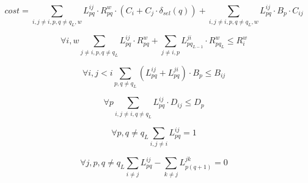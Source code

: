 $$
cost = 
    \sum_{i,j\neq i,p,q \neq q_L,w} {L^{ij}_{pq} \cdot R^{w}_{pq} \cdot(C_{i}+C_{j} \cdot \delta_{sel}(q))} + 
    \sum_{i,j \neq i,p,q \neq q_L,w} L^{ij}_{pq} \cdot B_p \cdot  C_{ij}
$$

$$
\forall i,w 
    \sum_{j \neq i,p,q \neq q_L} L^{ij}_{pq} \cdot R^{w}_{pq} +
    \sum_{j \neq i,p} L^{ji}_{pq_{L-1}} \cdot R^{w}_{pq_L}
    \leq R^{w}_i
$$

$$
    \forall i, j < i \sum_{p,q \neq q_{L}} (L^{ij}_{pq} + L^{ji}_{pq}) \cdot B_p \leq B_{ij}
$$

$$
    \forall{p} \sum_{i,j \neq i,q \neq q_L} L^{ij}_{pq} \cdot D_{ij} \leq D_p 
$$

$$
    \forall{p,q \neq q_L} \sum_{i,j \neq i}  L^{ij}_{pq} = 1
$$

$$
    \forall{j,p,q \neq q_L} \sum_{i \neq j} L^{ij}_{pq} - \sum_{k \neq j} L^{jk}_{p(q+1)} = 0
$$